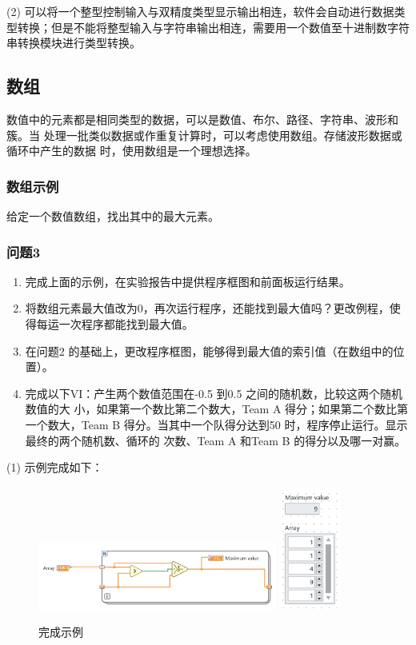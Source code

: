 \documentclass{../source/Experiment}
\begin{document}
        (2)  可以将一个整型控制输入与双精度类型显示输出相连，软件会自动进行数据类型转换；但是不能将整型输入与字符串输出相连，需要用一个数值至十进制数字符串转换模块进行类型转换。

        \subsection{数组}
        数值中的元素都是相同类型的数据，可以是数值、布尔、路径、字符串、波形和簇。当
        处理一批类似数据或作重复计算时，可以考虑使用数组。存储波形数据或循环中产生的数据
        时，使用数组是一个理想选择。
        \subsubsection{数组示例}
        给定一个数值数组，找出其中的最大元素。
        \subsubsection{问题3}
        \begin{enumerate}
            \item 完成上面的示例，在实验报告中提供程序框图和前面板运行结果。
            \item 将数组元素最大值改为0，再次运行程序，还能找到最大值吗？更改例程，使得每运一次程序都能找到最大值。
            \item 在问题2 的基础上，更改程序框图，能够得到最大值的索引值（在数组中的位置）。
            \item 完成以下VI：产生两个数值范围在-0.5 到0.5 之间的随机数，比较这两个随机数值的大
            小，如果第一个数比第二个数大，Team A 得分；如果第二个数比第一个数大，Team B
            得分。当其中一个队得分达到50 时，程序停止运行。显示最终的两个随机数、循环的
            次数、Team A 和Team B 的得分以及哪一对赢。
        \end{enumerate}
        
        (1) 示例完成如下：

        \begin{figure}[H]
            \centering
            \includegraphics[width = 0.7\textwidth]{lab8/lab1-数组-a.jpg}
            \includegraphics[width = 0.18\textwidth]{lab8/lab1-数组-b.jpg}
            \caption{完成示例}
        \end{figure}
\end{document}
